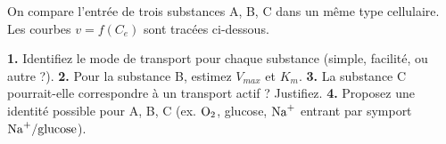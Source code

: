 \documentclass[11pt]{article}
\begin{document}
\begin{exercice}
On compare l'entrée de trois substances A, B, C dans un même type cellulaire. Les courbes $v = f(C_e)$ sont tracées ci-dessous.
\begin{center}
\end{center}
\textbf{1.} Identifiez le mode de transport pour chaque substance (simple, facilité, ou autre ?).
\textbf{2.} Pour la substance B, estimez $V_{max}$ et $K_m$.
\textbf{3.} La substance C pourrait-elle correspondre à un transport actif ? Justifiez.
\textbf{4.} Proposez une identité possible pour A, B, C (ex. $\ce{O2}$, glucose, $\ce{Na+}$ entrant par symport $\ce{Na+/glucose}$).
\end{exercice}
\end{document}
